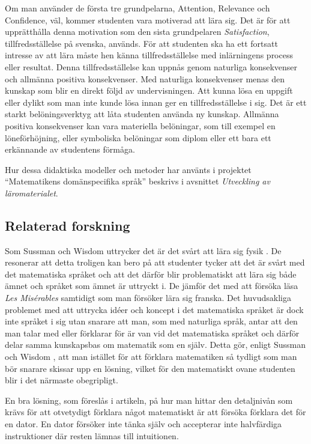 \documentclass[]{article}
\begin{document}
Om man använder de första tre grundpelarna, Attention, Relevance och Confidence,
väl, kommer studenten vara motiverad att lära sig.
Det är för att upprätthålla denna motivation som den sista grundpelaren
\textit{Satisfaction}, tillfredsställelse på svenska, används.
För att studenten ska ha ett fortsatt intresse av att lära måste hen känna
tillfredsställelse med inlärningens process eller resultat.
Denna tillfredsställelse kan uppnås genom naturliga konsekvenser och allmänna positiva
konsekvenser. Med naturliga konsekvenser menas den kunskap som blir
en direkt följd av undervisningen. Att kunna lösa en uppgift eller dylikt
som man inte kunde lösa innan ger en tillfredsställelse i sig.
Det är ett starkt belöningsverktyg att låta studenten använda ny kunskap.
Allmänna positiva konsekvenser kan vara materiella belöningar,
som till exempel en löneförhöjning, eller symboliska belöningar som diplom
eller ett bara ett erkännande av studentens förmåga.

Hur dessa didaktiska modeller och metoder har använts i projektet
``Matematikens domänspecifika språk'' beskrivs i avsnittet
\textit{Utveckling av läromaterialet}.

\subsection{Relaterad forskning}
Som Sussman och Wisdom uttrycker det är det svårt att lära sig fysik
\cite{sussman2002role}. De resonerar att detta troligen kan bero på att
studenter tycker att det är svårt med det matematiska språket och att det
därför blir problematiskt att lära sig både ämnet och språket som ämnet är
uttryckt i. De jämför det med att försöka läsa \textit{Les Misérables}
samtidigt som man försöker lära sig franska. Det huvudsakliga problemet med att
uttrycka idéer och koncept i det matematiska språket är dock inte språket i sig
utan snarare att man, som med naturliga språk, antar att den man talar med
eller förklarar för är van vid det matematiska språket och därför delar
samma kunskapsbas om matematik som en själv. Detta gör, enligt Sussman och
Wisdom \cite{sussman2002role}, att man istället för att förklara matematiken
så tydligt som man bör snarare skissar upp en lösning, vilket för den
matematiskt ovane studenten blir i det närmaste obegripligt.

En bra lösning, som föreslås i artikeln, på hur man hittar den detaljnivån som
krävs för att otvetydigt förklara något matematiskt är att försöka förklara
det för en dator. En dator försöker inte tänka själv och accepterar inte
halvfärdiga instruktioner där resten lämnas till intuitionen.
\end{document}
